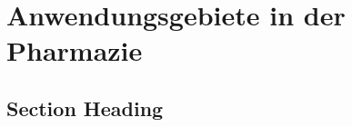 \chapter{Anwendungsgebiete in der Pharmazie}
\label{trends} %



\section{Section Heading}


\printbibliography
